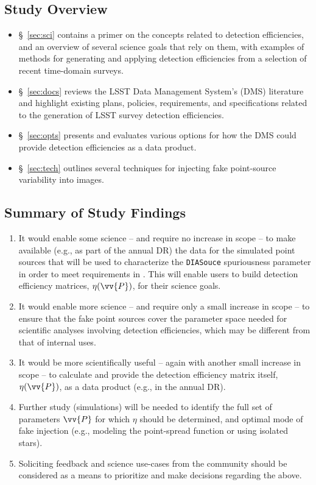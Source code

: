 \documentclass[DM,lsstdraft,toc]{lsstdoc}
\begin{document}
\subsection{Study Overview}
\begin{itemize}
\item \S~\ref{sec:sci} contains a primer on the concepts related to detection efficiencies, and an overview of several science goals that rely on them, with examples of methods for generating and applying detection efficiencies from a selection of recent time-domain surveys. 
\item \S~\ref{sec:docs} reviews the LSST Data Management System's (DMS) literature and highlight existing plans, policies, requirements, and specifications related to the generation of LSST survey detection efficiencies. 
\item \S~\ref{sec:opts} presents and evaluates various options for how the DMS could provide detection efficiencies as a data product. 
\item \S~\ref{sec:tech} outlines several techniques for injecting fake point-source variability into images.
\end{itemize}

\subsection{Summary of Study Findings}
\begin{enumerate}
\item It would enable some science -- and require no increase in scope -- to make available (e.g., as part of the annual DR) the data for the simulated point sources that will be used to characterize the {\tt DIASouce} spuriousness parameter in order to meet requirements in . This will enable users to build detection efficiency matrices, $\eta(\vv{P})$, for their science goals.
\item It would enable more science -- and require only a small increase in scope -- to ensure that the fake point sources cover the parameter space needed for scientific analyses involving detection efficiencies, which may be different from that of internal uses. 
\item It would be more scientifically useful -- again with another small increase in scope -- to calculate and provide the detection efficiency matrix itself, $\eta(\vv{P})$, as a data product (e.g., in the annual DR).
\item Further study (simulations) will be needed to identify the full set of parameters $\vv{P}$ for which $\eta$ should be determined, and optimal mode of fake injection (e.g., modeling the point-spread function or using isolated stars).
\item Soliciting feedback and science use-cases from the community should be considered as a means to prioritize and make decisions regarding the above.
\end{enumerate}
\end{document}
